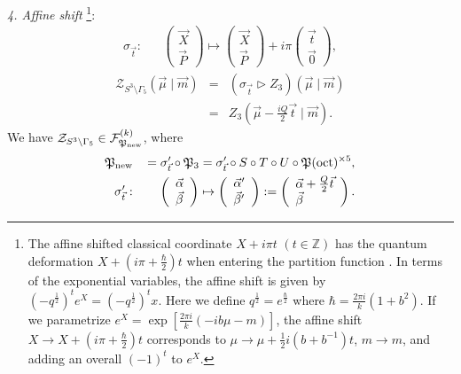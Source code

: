 \documentclass[aps,prd,notitlepage,nofootinbib,superscriptaddress,groupedaddress,twocolumn]{revtex4-1}
\def\be{\begin{eqnarray}}
\def\ee{\end{eqnarray}}
\newcommand{\cf}{\mathcal F}
\newcommand{\cz}{\mathcal Z}
\renewcommand{\a}{\alpha}
\renewcommand{\b}{\beta}
\newcommand{\G}{\Gamma}
\newcommand{\sig}{\sigma}
\newcommand{\lt}{\left}
\newcommand{\rt}{\right}
\newcommand{\act}{\rhd}
\begin{document}

\emph{4. Affine shift} \footnote{The affine shifted classical coordinate $X+i\pi t$ $(t\in\mathbb{Z})$ has the quantum deformation $X+(i\pi+\frac{\hbar}{2}) t$ when entering the partition function \cite{Dimofte2011}. In terms of the exponential variables, the affine shift is given by $(-q^{\frac{1}{2}})^te^X=(-q^{\frac{1}{2}})^tx$. Here we define $q^{\frac{1}{2}}=e^{\frac{\hbar}{2}}$ where $\hbar=\frac{2\pi i}{k}(1+b^2)$. If we parametrize $e^X=\exp[\frac{2 \pi  i}{k} \left(-i b \mu -m\right)]$, the affine shift $X\to X+(i\pi+\frac{\hbar}{2}) t$ corresponds to $\mu \to \mu +\frac{1}{2} i \left(b+{b}^{-1}\right) t$, $m\to m$, and adding an overall $(-1)^t$ to $e^X$.}:
\be
\sig_{\vec{t}}:&& \left(\begin{array}{l}
\vec{X} \\
\vec{P}
\end{array}\right)\mapsto \left(\begin{array}{l}
\vec{X} \\
\vec{P}
\end{array}\right)+i \pi\left(\begin{array}{l}
\vec{t} \\
\vec{0}
\end{array}\right),
\ee
\be
\cz_{S^3\setminus \G_5}(\vec{\mu}\mid \vec{m})&=&(\sig_{\vec{t}}\act Z_3)(\vec{\mu}\mid \vec{m})\nonumber\\
&=&Z_3\lt(\vec{\mu}-\frac{iQ}{2}\vec{t}\mid \vec{m}\rt).\label{affinetrans}
\ee
We have $\cz_{S^3\setminus \G_5}\in \cf_{\Fp_{\rm new}}^{(k)}$, where 
\be
\Fp_{\rm new}&&\,=\sig'_{\vec{t}}\circ \Fp_3=\sig'_{\vec{t}}\circ S\circ T\circ U\circ\Fp(\mathrm{oct})^{\times 5},\\
\sig'_{\vec{t}}:&&\ \left(\begin{array}{l}
	\vec{\a} \\
	\vec{\b}
	\end{array}\right)\mapsto\left(\begin{array}{l}
		\vec{\a}' \\
		\vec{\b}'
		\end{array}\right):= \left(\begin{array}{l}
	\vec{\a}+\frac{Q}{2}\vec{t} \\
	\vec{\b}
	\end{array}\right).\nonumber
\ee
\end{document}
